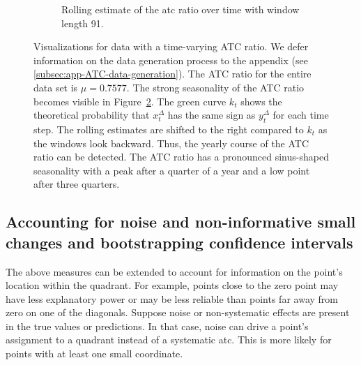 \documentclass[pdflatex]{sn-jnl}
\theoremstyle{plain}%
\theoremstyle{definition}
\newcommand{\diffxt}[1][t]{x^{\Delta}_{#1}}
\newcommand{\diffyt}[1][t]{y^{\Delta}_{#1}}
\begin{document}
\begin{figure}
\begin{subfigure}[t]{.48\textwidth}
    \caption{Rolling estimate of the \ac{atc} ratio over time with window length 91. }\label{fig:atc_ratio_time_series}
    \end{subfigure}%
    \caption[Visualizations of the four-quadrant plot for data with a time-varying ATC ratio.]{Visualizations for data with a time-varying ATC ratio. We defer information on the data generation process to the appendix (see \ref{subsec:app-ATC-data-generation}). The ATC ratio for the entire data set is $\mu = 0.7577$. The strong seasonality of the ATC ratio becomes visible in Figure~\ref{fig:atc_ratio_time_series}. The green curve $k_t$ shows the theoretical probability that $\diffxt$ has the same sign as $\diffyt$ for each time step. The rolling estimates are shifted to the right compared to $k_t$ as the windows look backward. Thus, the yearly course of the ATC ratio can be detected.
The ATC ratio has a pronounced sinus-shaped seasonality with a peak after a quarter of a year and a low point after three quarters.
}
\end{figure}

\subsection{Accounting for noise and non-informative small changes and bootstrapping confidence intervals}\label{subsec:aatc-noise}

The above measures can be extended to account for information on the point's location within the quadrant.
For example, points close to the zero point may have less explanatory power or may be less reliable than points far away from zero on one of the diagonals.
Suppose noise or non-systematic effects are present in the true values or predictions.
In that case, noise can drive a point's assignment to a quadrant instead of a systematic \ac{atc}.
This is more likely for points with at least one small coordinate.
\end{document}
